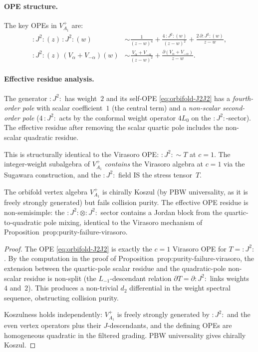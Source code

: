 \documentclass[11pt]{article}
\begin{document}
\paragraph{OPE structure.}
The key OPEs in $V_{A_1}^{+}$ are:
\begin{align}
:J^2:(z)\, :J^2:(w) &\sim
  \frac{1}{(z-w)^4} + \frac{4\,:J^2:(w)}{(z-w)^2}
  + \frac{2\,\partial :J^2:(w)}{z-w},
  \label{eq:orbifold-J2J2}\\
:J^2:(z)\, (V_\alpha + V_{-\alpha})(w) &\sim
  \frac{V_\alpha + V_{-\alpha}}{(z-w)^2}
  + \frac{\partial(V_\alpha + V_{-\alpha})}{z-w}.
  \label{eq:orbifold-J2V}
\end{align}

\paragraph{Effective residue analysis.}
The generator $:J^2:$ has weight~$2$ and its self-OPE
\eqref{eq:orbifold-J2J2} has a \emph{fourth-order pole}
with scalar coefficient~$1$ (the central term) and a
\emph{non-scalar second-order pole} ($4\,:J^2:$ acts
by the conformal weight operator $4L_0$ on the
$:J^2:$-sector).  The effective residue after removing
the scalar quartic pole includes the non-scalar quadratic
residue.

This is structurally identical to the Virasoro OPE:
$:J^2: \sim T$ at $c = 1$.  The integer-weight
subalgebra of $V_{A_1}^{+}$ \emph{contains} the
Virasoro algebra at $c = 1$ via the Sugawara construction,
and the $:J^2:$ field IS the stress tensor~$T$.

\begin{proposition}
\label{prop:orbifold-A1-koszul}
The orbifold vertex algebra $V_{A_1}^{+}$ is chirally
Koszul \textup{(}by PBW universality, as it is freely
strongly generated\textup{)} but fails collision purity.
The effective OPE residue is non-semisimple: the
$:J^2: \otimes :J^2:$ sector contains a Jordan block
from the quartic-to-quadratic pole mixing, identical
to the Virasoro mechanism of
Proposition~prop:purity-failure-virasoro.
\end{proposition}

\begin{proof}
The OPE \eqref{eq:orbifold-J2J2} is exactly the
$c = 1$ Virasoro OPE for $T = :J^2:$.  By the
computation in the proof of
Proposition~prop:purity-failure-virasoro,
the extension between the quartic-pole scalar residue
and the quadratic-pole non-scalar residue is non-split
(the $L_{-1}$-descendant relation $\partial T = \partial :J^2:$
links weights~$4$ and~$2$).  This produces a non-trivial
$d_2$ differential in the weight spectral sequence,
obstructing collision purity.

Koszulness holds independently: $V_{A_1}^{+}$ is freely
strongly generated by $:J^2:$ and the even vertex
operators plus their $J$-descendants, and the defining
OPEs are homogeneous quadratic in the filtered grading.
PBW universality gives chirally Koszul.
\end{proof}
\end{document}

